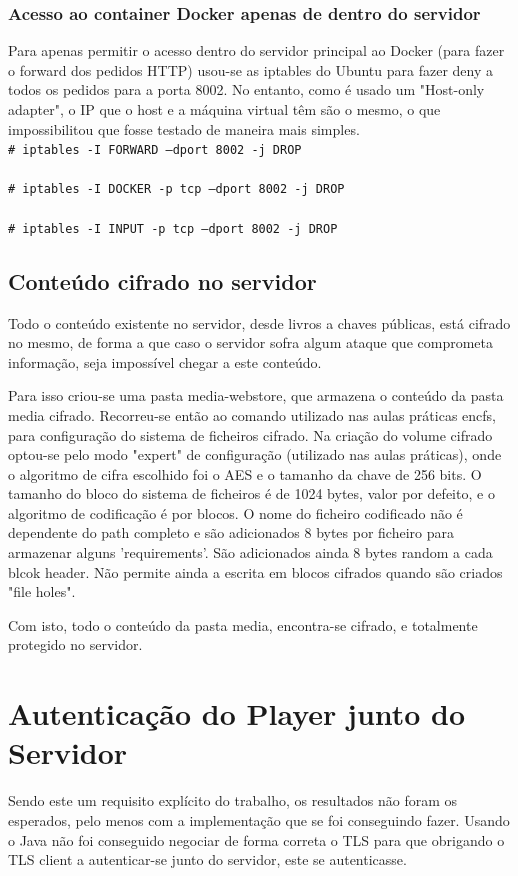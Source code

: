 \documentclass[pdftex,12pt,a4paper]{report}
\newcommand{\shellcmd}[1]{\\\indent\indent\texttt{\footnotesize\# #1}\\}
\begin{document}
\subsubsection{Acesso ao container Docker apenas de dentro do servidor}

Para apenas permitir o acesso dentro do servidor principal ao Docker (para fazer o forward dos pedidos HTTP) usou-se as iptables do Ubuntu para fazer deny a todos os pedidos para a porta 8002. No entanto, como é usado um "Host-only adapter", o IP que o host e a máquina virtual têm são o mesmo, o que impossibilitou que fosse testado de maneira mais simples.
\shellcmd{iptables -I FORWARD  --dport 8002 -j DROP}
\shellcmd{iptables -I DOCKER -p tcp --dport 8002 -j DROP}
\shellcmd{iptables -I INPUT -p tcp --dport 8002 -j DROP}

\subsection{Conteúdo cifrado no servidor}
Todo o conteúdo existente no servidor, desde livros a chaves públicas, está cifrado no mesmo, de forma a que caso o servidor sofra algum ataque que comprometa informação, seja impossível chegar a este conteúdo.

Para isso criou-se uma pasta media-webstore, que armazena o conteúdo da pasta media cifrado. Recorreu-se então ao comando utilizado nas aulas práticas encfs, para configuração do sistema de ficheiros cifrado. Na criação do volume cifrado optou-se pelo modo "expert" de configuração (utilizado nas aulas práticas), onde o algoritmo de cifra escolhido foi o AES e o tamanho da chave de 256 bits. O tamanho do bloco do sistema de ficheiros é de 1024 bytes, valor por defeito, e o algoritmo de codificação é por blocos. O nome do ficheiro codificado não é dependente do path completo e são adicionados 8 bytes por ficheiro para armazenar alguns 'requirements'. São adicionados ainda 8 bytes random a cada blcok header. Não permite ainda a escrita em blocos cifrados quando são criados "file holes".

Com isto, todo o conteúdo da pasta media, encontra-se cifrado, e totalmente protegido no servidor.

\section{Autenticação do Player junto do Servidor}

Sendo este um requisito explícito do trabalho, os resultados não foram os esperados, pelo menos com a implementação que se foi conseguindo fazer. Usando o Java não foi conseguido negociar de forma correta o TLS para que obrigando o TLS client a autenticar-se junto do servidor, este se autenticasse.
\end{document}
